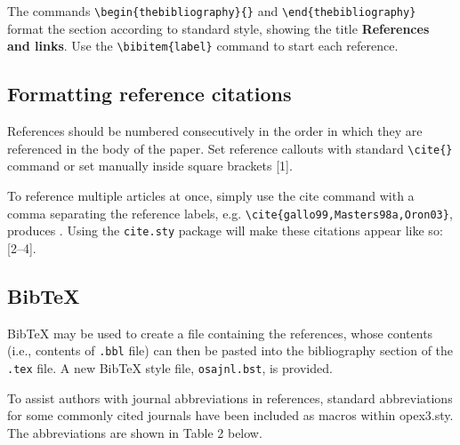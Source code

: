 \documentclass[10pt]{article}
\begin{document}
The commands \verb+\begin{thebibliography}{}+ and \verb+\end{thebibliography}+ format the section according to standard style, showing the title {\bfseries References and links}.  Use the \verb+\bibitem{label}+ command to start each reference.

\subsection{Formatting reference citations}
References should be numbered consecutively in the order in which they are referenced in the body of the paper. Set reference callouts with standard \verb+\cite{}+ command or set manually inside square brackets [1].

To reference multiple articles at once, simply use the cite command with a comma separating the reference labels, e.g. \verb+\cite{gallo99,Masters98a,Oron03}+, produces \cite{gallo99,Masters98a,Oron03}. Using the \texttt{cite.sty} package will make these citations appear like so: [2--4].

\subsection{Bib\TeX}
\label{sec:bibtex}
Bib\TeX{} may be used to create a file containing the references, whose contents (i.e., contents of \texttt{.bbl} file) can then be pasted into the bibliography section of the \texttt{.tex} file. A new Bib\TeX{} style file, \texttt{osajnl.bst}, is provided.

To assist authors with journal abbreviations in references, standard abbreviations for some commonly cited journals have been included as macros within opex3.sty.  The abbreviations are shown in Table 2 below.
\end{document}
